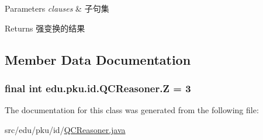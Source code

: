 \begin{DoxyParams}{Parameters}
{\em clauses} & 子句集 \\
\hline
\end{DoxyParams}
\begin{DoxyReturn}{Returns}
强变换的结果 
\end{DoxyReturn}


\subsection{Member Data Documentation}
\hypertarget{classedu_1_1pku_1_1id_1_1_q_c_reasoner_af0acf65658bdcdc6c8c4dc45652a85a9}{
\subsubsection[{Z}]{\setlength{\rightskip}{0pt plus 5cm}final int {\bf edu.pku.id.QCReasoner.Z} = 3}}
\label{classedu_1_1pku_1_1id_1_1_q_c_reasoner_af0acf65658bdcdc6c8c4dc45652a85a9}


The documentation for this class was generated from the following file:\begin{DoxyCompactItemize}
\item 
src/edu/pku/id/\hyperlink{_q_c_reasoner_8java}{QCReasoner.java}\end{DoxyCompactItemize}
